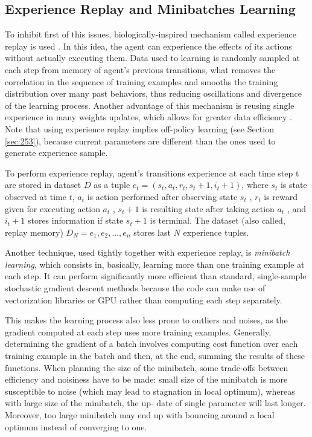     \subsection{Experience Replay and Minibatches Learning}
         To inhibit first of this issues, biologically-inspired mechanism called experience
        replay is used \cite{Lin1992}. In this idea, the agent can experience the effects of its actions without actually executing them. Data used to learning is randomly sampled at each step from memory of agent's previous transitions, what removes the correlation in the sequence of training examples and smooths the training distribution over many past behaviors, thus reducing oscillations and divergence of the learning process. Another advantage of this mechanism is reusing single experience in many weights updates, which allows for greater data efficiency \cite{mnih2015humanlevel}. Note that using experience replay implies
        off-policy learning (see Section \ref{sec:253}), because current parameters are different than the ones used to generate experience sample. 
    \par
         To perform experience replay, agent's transitions experience at each time step t are stored in dataset $D$ as a tuple $ e_t = (s_t , a_t , r_t , s_t+1 , i_t+1 )$, where $s_t$ is state observed at time $t$, $a_t$ is action
        performed after observing state $s_t$ , $r_t$ is reward given for executing action $a_t$ , $s_t+1$ is resulting
        state after taking action $a_t$ , and $i_t+1$ stores information if state $s_t+1$ is terminal. The dataset (also
        called, replay memory) $D_N = {e_1 , e_2 , ..., e_n }$ stores last $N$ experience tuples.
    \par
        Another technique, used tightly together with experience replay, is \textit{minibatch learning}, which consists in, basically, learning more than one training example at each step. It can perform significantly more efficient than standard, single-sample stochastic gradient descent methods because the code can make use of vectorization libraries or GPU rather than computing each step separately.
    \par
        This makes the learning process also less prone to outliers and noises, as the gradient computed at each step uses more training examples. Generally, determining the gradient of a batch involves computing cost function over each training example in the batch and then, at the end, summing the results of these functions. When planning the size of the minibatch, some trade-offs between efficiency and noisiness have to be made: small size of the minibatch is more susceptible to noise (which may lead to stagnation in local optimum), whereas with large size of the minibatch, the up- date of single parameter will last longer. Moreover, too large minibatch may end up with bouncing around a local optimum instead of converging to one.
